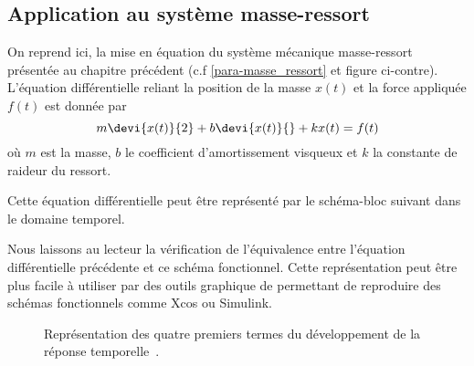 \subsection{Application au système masse-ressort}
On reprend ici, la mise en équation du système mécanique masse-ressort 
présentée au chapitre précédent (c.f \cref{para-masse_ressort} et figure 
ci-contre). L'équation différentielle reliant la position de la masse $x(t)$ et 
la force appliquée $f(t)$ est donnée par 
\[
m\devi{x(t)}{2}+b\devi{x(t)}{}+kx(t)=f(t)
\]
où $m$ est la masse, $b$ le coefficient d'amortissement visqueux et $k$ la
constante de raideur du ressort. 
\begin{marginfigure}
    \centering
    
\end{marginfigure}
\clearpage
\restoregeometry
\captionsetup{width=0.9\linewidth}
Cette équation différentielle peut être représenté par le schéma-bloc suivant
dans le domaine temporel.
\begin{center}
    
\end{center}
Nous laissons au lecteur la vérification de l'équivalence entre l'équation
différentielle précédente et ce schéma fonctionnel.
Cette représentation peut être plus facile à utiliser par des outils graphique
de permettant de reproduire des schémas fonctionnels comme Xcos ou Simulink.
\clearpage
\begin{figure}[!h]
    \centering
    
    
    
    
    
    
    
    \caption{Représentation des quatre premiers termes du développement 
    de la réponse temporelle~\label{fig-cycles}.}
\end{figure}
\clearpage
